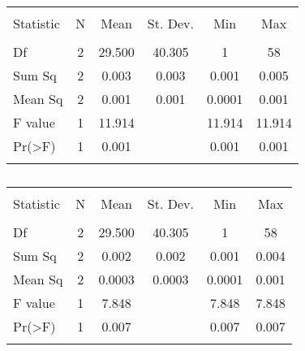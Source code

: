 \begin{table}[!htbp] \centering 
  \caption{} 
  \label{} 
\begin{tabular}{@{\extracolsep{5pt}}lccccc} 
\\[-1.8ex]\hline 
\hline \\[-1.8ex] 
Statistic & \multicolumn{1}{c}{N} & \multicolumn{1}{c}{Mean} & \multicolumn{1}{c}{St. Dev.} & \multicolumn{1}{c}{Min} & \multicolumn{1}{c}{Max} \\ 
\hline \\[-1.8ex] 
Df & 2 & 29.500 & 40.305 & 1 & 58 \\ 
Sum Sq & 2 & 0.003 & 0.003 & 0.001 & 0.005 \\ 
Mean Sq & 2 & 0.001 & 0.001 & 0.0001 & 0.001 \\ 
F value & 1 & 11.914 &  & 11.914 & 11.914 \\ 
Pr(\textgreater F) & 1 & 0.001 &  & 0.001 & 0.001 \\ 
\hline \\[-1.8ex] 
\end{tabular} 
\end{table} 

\begin{table}[!htbp] \centering 
  \caption{} 
  \label{} 
\begin{tabular}{@{\extracolsep{5pt}}lccccc} 
\\[-1.8ex]\hline 
\hline \\[-1.8ex] 
Statistic & \multicolumn{1}{c}{N} & \multicolumn{1}{c}{Mean} & \multicolumn{1}{c}{St. Dev.} & \multicolumn{1}{c}{Min} & \multicolumn{1}{c}{Max} \\ 
\hline \\[-1.8ex] 
Df & 2 & 29.500 & 40.305 & 1 & 58 \\ 
Sum Sq & 2 & 0.002 & 0.002 & 0.001 & 0.004 \\ 
Mean Sq & 2 & 0.0003 & 0.0003 & 0.0001 & 0.001 \\ 
F value & 1 & 7.848 &  & 7.848 & 7.848 \\ 
Pr(\textgreater F) & 1 & 0.007 &  & 0.007 & 0.007 \\ 
\hline \\[-1.8ex] 
\end{tabular} 
\end{table} 

